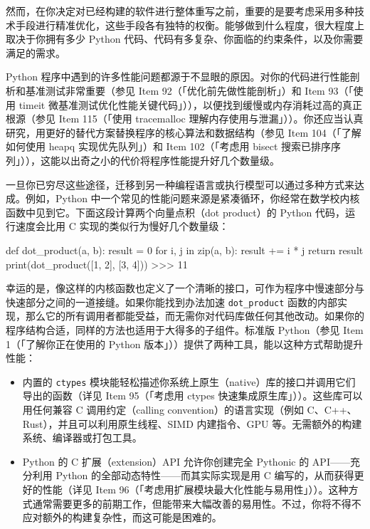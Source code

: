 然而，在你决定对已经构建的软件进行整体重写之前，重要的是要考虑采用多种技术手段进行精准优化，这些手段各有独特的权衡。能够做到什么程度，很大程度上取决于你拥有多少 Python 代码、代码有多复杂、你面临的约束条件，以及你需要满足的需求。

Python 程序中遇到的许多性能问题都源于不显眼的原因。对你的代码进行性能剖析和基准测试非常重要（参见 Item 92（「优化前先做性能剖析」）和 Item 93（「使用 timeit 微基准测试优化性能关键代码」）），以便找到缓慢或内存消耗过高的真正根源（参见 Item 115（「使用 tracemalloc 理解内存使用与泄漏」））。你还应当认真研究，用更好的替代方案替换程序的核心算法和数据结构（参见 Item 104（「了解如何使用 heapq 实现优先队列」）和 Item 102（「考虑用 bisect 搜索已排序序列」）），这能以出奇之小的代价将程序性能提升好几个数量级。

一旦你已穷尽这些途径，迁移到另一种编程语言或执行模型可以通过多种方式来达成。例如，Python 中一个常见的性能问题来源是紧凑循环，你经常在数学校内核函数中见到它。下面这段计算两个向量点积（dot product）的 Python 代码，运行速度会比用 C 实现的类似行为慢好几个数量级：

\begin{codebox}[python]
def dot_product(a, b):
    result = 0
    for i, j in zip(a, b):
        result += i * j
    return result
print(dot_product([1, 2], [3, 4]))
>>>
11
\end{codebox}

幸运的是，像这样的内核函数也定义了一个清晰的接口，可作为程序中慢速部分与快速部分之间的一道接缝。如果你能找到办法加速 \texttt{dot\_product} 函数的内部实现，那么它的所有调用者都能受益，而无需你对代码库做任何其他改动。如果你的程序结构合适，同样的方法也适用于大得多的子组件。标准版 Python（参见 Item 1（「了解你正在使用的 Python 版本」））提供了两种工具，能以这种方式帮助提升性能：

\begin{itemize}
\item 内置的 \texttt{ctypes} 模块能轻松描述你系统上原生（native）库的接口并调用它们导出的函数（详见 Item 95（「考虑用 ctypes 快速集成原生库」））。这些库可以用任何兼容 C 调用约定（calling convention）的语言实现（例如 C、C++、Rust），并且可以利用原生线程、SIMD 内建指令、GPU 等。无需额外的构建系统、编译器或打包工具。
\item Python 的 C 扩展（extension）API 允许你创建完全 Pythonic 的 API——充分利用 Python 的全部动态特性——而其实际实现是用 C 编写的，从而获得更好的性能（详见 Item 96（「考虑用扩展模块最大化性能与易用性」））。这种方式通常需要更多的前期工作，但能带来大幅改善的易用性。不过，你将不得不应对额外的构建复杂性，而这可能是困难的。
\end{itemize}

